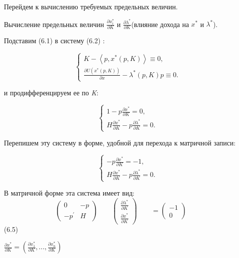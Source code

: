 \documentclass[12pt, 4paper]{book}
\begin{document}
{Перейдем к вычислению требуемых предельных величин. 
\par

Вычисление предельных величин $\frac{\partial x_{i}^{*}}{\partial K}$ и $\frac{\partial \lambda^{*}}{\partial K} $(влияние дохода на $x^{*}$ и $\lambda^{*}$).
\par
 
Подставим (6.1) в систему (6.2) : 
\begin{center}
$$\left\{
\begin{aligned}
K - \left\langle p,x^{*}(p,K)\right\rangle \equiv 0,\\
\frac{\partial U(x^{*}(p,K))}{\partial x }- \lambda^{*}(p,K)p \equiv 0.
\end{aligned}
\right.$$
\end{center}
\par

и продифференцируем ее по \textit{K}: 
\begin{center}
$$\left\{
\begin{aligned}
1 - p\frac{\partial x^{*}}{\partial K} = 0,\\
H\frac{\partial x^{*}}{\partial K} - p\frac{\partial \lambda^{*}}{\partial K}=0.
\end{aligned}
\right.$$
\end{center}
\par

Перепишем эту систему в форме, удобной для перехода к матричной записи: 
\begin{center}
$$\left\{
\begin{aligned}
- p\frac{\partial x^{*}}{\partial K} = -1,\\
H\frac{\partial x^{*}}{\partial K} - p\frac{\partial \lambda^{*}}{\partial K}=0.
\end{aligned}
\right.$$
\end{center}
\par

В матричной форме эта система имеет вид: 
\[ \begin{pmatrix} 0 & -p \\ -p^{'} & H \end{pmatrix} \qquad
	 \begin{pmatrix} \frac{\partial \lambda^{*}}{\partial K}\\ 
\frac{\partial x^{*}}{\partial K} \end{pmatrix} \qquad =
	 \begin{pmatrix} -1 \\ 0 \end{pmatrix} \qquad \] (6.5)
\newline
\begin{center}
$\frac{\partial x^{*}}{\partial K}=\left(\frac{\partial x_{1}^{*}}{\partial K},..., \frac{\partial x_{n}^{*}}{\partial K}\right)$
\end{center}
\par

}
\end{document}
